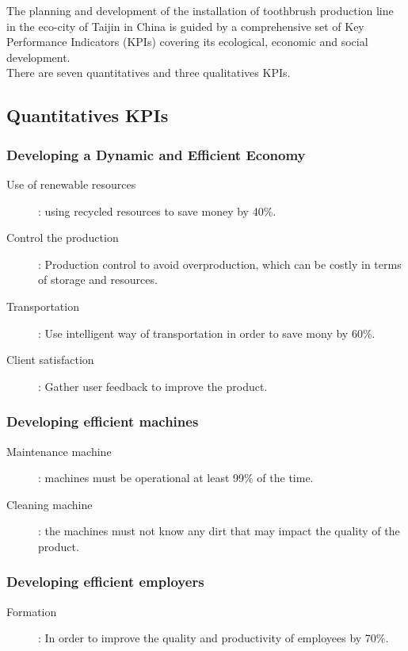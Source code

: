 The planning and development of the installation of toothbrush production line in the eco-city of Taijin in China is guided by a comprehensive set of Key Performance Indicators (KPIs) covering its ecological, economic and social development.\\

There are seven quantitatives and three qualitatives KPIs.

\subsection{Quantitatives KPIs}

\subsubsection{Developing a Dynamic and Efficient Economy}
\begin{description}
    \item[Use of renewable resources]: using recycled resources to save money by 40\%.
    \item[Control the production]: Production control to avoid overproduction, which can be costly in terms of storage and resources.
    \item[Transportation]: Use intelligent way of transportation in order to save mony by 60\%.
    \item[Client satisfaction]: Gather user feedback to improve the product.
\end{description}

\subsubsection{Developing efficient machines}
\begin{description}
    \item[Maintenance machine]: machines must be operational at least 99\% of the time.
    \item[Cleaning machine]: the machines must not know any dirt that may impact the quality of the product.
\end{description}

\subsubsection{Developing efficient employers}
\begin{description}
    \item[Formation]: In order to improve the quality and productivity of employees by 70\%.
\end{description}

